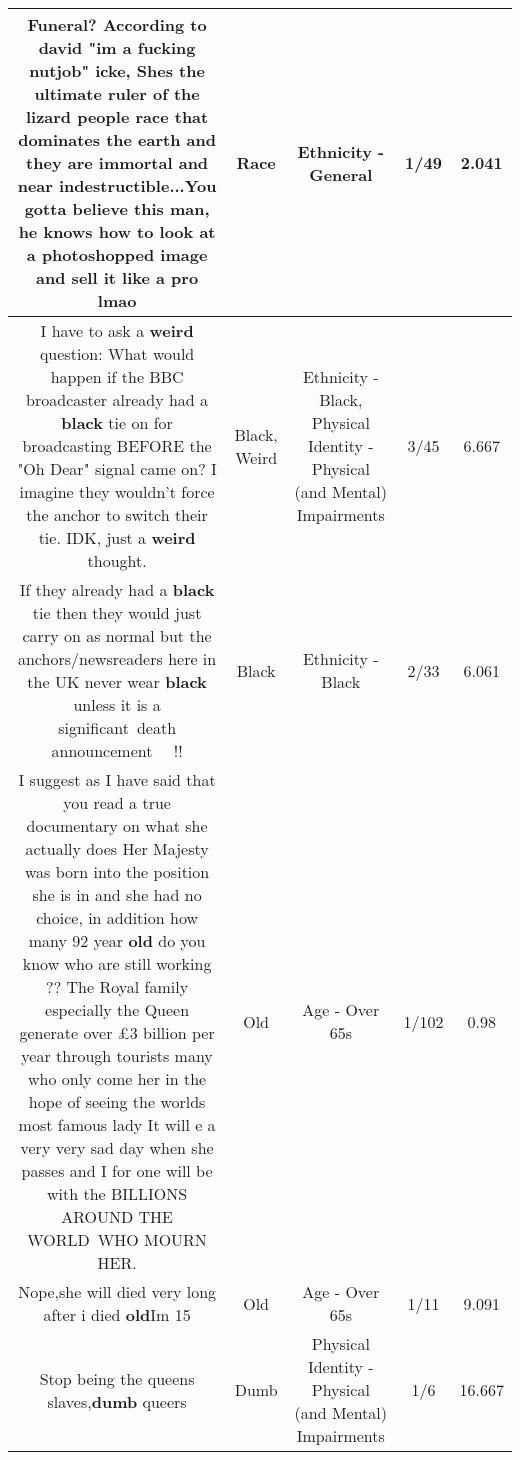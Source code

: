 \documentclass[11pt]{article}
\newlength\mylength
\begin{document}
\begin{center}
\begin{longtable}{|C{.65\mylength}|C{.30\mylength}|C{.12\mylength}|C{.12\mylength}|C{.12\mylength}|}
  \small Funeral? According to david "im a fucking nutjob" icke, Shes the ultimate ruler of the lizard people \textbf{race} that dominates the earth and they are immortal and near indestructible...You gotta believe this man, he knows how to look at a photoshopped image and sell it like a pro lmao\normalsize   & Race & Ethnicity - General & 1/49 & 2.041 \\  \hline
  \small I have to ask a \textbf{weird} question: What would happen if the BBC broadcaster already had a \textbf{black} tie on for broadcasting BEFORE the "Oh Dear" signal came on? I imagine they wouldn't force the anchor to switch their tie. IDK, just a \textbf{weird} thought.\normalsize   & Black, Weird & Ethnicity - Black, Physical Identity - Physical (and Mental) Impairments & 3/45 & 6.667 \\  \hline
  \small If they already had a \textbf{black} tie then they would just carry on as normal but the anchors/newsreaders here in the UK never wear \textbf{black} unless it is a significant death announcement   !!\normalsize   & Black & Ethnicity - Black & 2/33 & 6.061 \\  \hline
  \small I suggest as I have said that you read a true documentary on what she actually does Her Majesty was born into the position she is in and she had no choice, in addition how many 92 year \textbf{old} do you know who are still working ?? The Royal family especially the Queen generate over £3 billion per year through tourists many who only come her in the hope of seeing the worlds most famous lady It will e a very very sad day when she passes and I for one will be with the BILLIONS AROUND THE WORLD WHO MOURN HER.\normalsize   & Old & Age - Over 65s & 1/102 & 0.98 \\  \hline
  \small Nope,she will died very long after i died \textbf{old}Im 15\normalsize   & Old & Age - Over 65s & 1/11 & 9.091 \\  \hline
  \small Stop being the queens slaves,\textbf{dumb} queers\normalsize   & Dumb & Physical Identity - Physical (and Mental) Impairments & 1/6 & 16.667 \\  \hline

\end{longtable}
\end{center}
\end{document}
